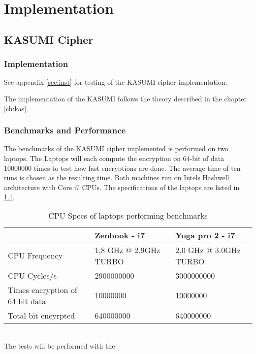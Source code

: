 \chapter{Implementation}
\label{ch:impl}
\section{KASUMI Cipher}
\subsection{Implementation}

See appendix \ref{sec:inst} for testing of the KASUMI cipher implementation.

The implementation of the KASUMI follows the theory described in the
chapter \ref{ch:kas}.

\subsection{Benchmarks and Performance}
\label{sec:benchkas}
The benchmarks of the KASUMI cipher implemented is performed on two
laptops. The Laptops will each compute the encryption on 64-bit of
data 10000000 times to test how fast encryptions are done. The average time of ten runs is
chosen as the resulting time. Both machines run on Intels Hashwell
architecture with Core i7 CPUs. The specifications of the laptops are
listed in \ref{tab:specs}.
\begin{table}[h!]
    \begin{tabular}{l|l|l}
                                    & Zenbook - i7           & Yoga
                                                               pro 2 -
      i7\\ \hline
    CPU Frequency                   & 1,8 GHz @ 2.9GHz TURBO & 2,0 GHz @ 3.0GHz TURBO \\ \hline
    CPU Cycles/s                    & 2900000000             & 3000000000             \\ \hline
    Times encryption of 64 bit data & 10000000               & 10000000               \\ \hline
    Total bit encyrpted             & 640000000              & 640000000              \\
    \end{tabular}
    \caption{CPU Specs of laptops performing benchmarks}
    \label{tab:specs}
\end{table}\\
The tests will be performed with the
